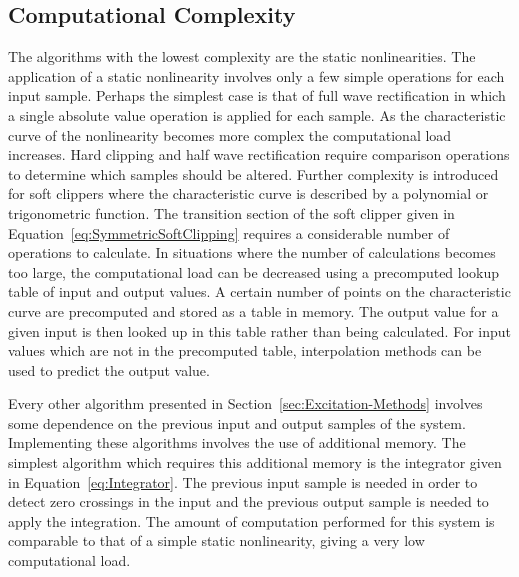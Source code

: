 	\subsection{Computational Complexity}
	\label{sec:ExcitationEvaluation-Comparison-Complexity}
		The algorithms with the lowest complexity are the static nonlinearities. The application of a static
		nonlinearity involves only a few simple operations for each input sample. Perhaps the simplest case is that
		of full wave rectification in which a single absolute value operation is applied for each sample. As the
		characteristic curve of the nonlinearity becomes more complex the computational load increases. Hard
		clipping and half wave rectification require comparison operations to determine which samples should be
		altered. Further complexity is introduced for soft clippers where the characteristic curve is described by
		a polynomial or trigonometric function. The transition section of the soft clipper given in
		Equation~\ref{eq:SymmetricSoftClipping} requires a considerable number of operations to calculate. In
		situations where the number of calculations becomes too large, the computational load can be decreased
		using a precomputed lookup table of input and output values. A certain number of points on the
		characteristic curve are precomputed and stored as a table in memory. The output value for a given input is
		then looked up in this table rather than being calculated. For input values which are not in the
		precomputed table, interpolation methods can be used to predict the output value.

		Every other algorithm presented in Section~\ref{sec:Excitation-Methods} involves some dependence on the
		previous input and output samples of the system. Implementing these algorithms involves the use of
		additional memory. The simplest algorithm which requires this additional memory is the integrator given in
		Equation~\ref{eq:Integrator}. The previous input sample is needed in order to detect zero crossings in the
		input and the previous output sample is needed to apply the integration. The amount of computation
		performed for this system is comparable to that of a simple static nonlinearity, giving a very low
		computational load.

